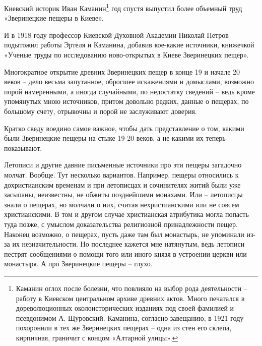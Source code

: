 Киевский историк Иван Каманин\footnote{Каманин оглох после болезни, что повлияло на выбор рода деятельности – работу в Киевском центральном архиве древних актов. Много печатался в дореволюционных околоисторических изданиях под своей фамилией и псевдонимом А. Щуровский. Каманина, согласно завещанию, в 1921 году похоронили в тех же Зверинецких пещерах – одна из стен его склепа, кирпичная, граничит с концом «Алтарной улицы».} год спустя выпустил более объемный труд «Зверинецкие пещеры в Киеве»\cite{kamanin01}.

И в 1918 году профессор Киевской Духовной Академии Николай Петров подытожил работы Эртеля и Каманина, добавив кое-какие источники, книжечкой «Ученые труды по исследованию ново-открытых в Киеве Зверинецких пещер».

 
Многократное открытие древних Зверинецких пещер в конце 19 и начале 20 веков – дело весьма запутанное, обросшее искажениями и домыслами, возможно порой намеренными, а иногда случайными, по недостатку сведений – ведь кроме упомянутых мною источников, притом довольно редких, данные о пещерах, по большому счету, отрывочны и порой не заслуживают доверия.


Кратко сведу воедино самое важное, чтобы дать представление о том, какими были Зверинецкие пещеры на стыке 19-20 веков, а не какими их теперь показывают.

Летописи и другие давние письменные источники про эти пещеры загадочно молчат. Вообще. Тут несколько вариантов. Например, пещеры относились к дохристианским временам и при летописцах и сочинителях житий были уже засыпаны, неизвестны, не обжиты позднейшими монахами. Или – летописцы знали о пещерах, но молчали о них, считая нехристианскими или не совсем христианскими. В том и другом случае христианская атрибутика могла попасть туда позже, с умыслом доказательства религиозной принадлежности пещер. Наконец возможно, о пещерах, пусть даже там был монастырь, не упоминали из-за их незначительности. Но последнее кажется мне натянутым, ведь летописи пестрят сообщениями о помощи того или иного князя в устроении церкви или монастыря. А про Зверинецкие пещеры – глухо.

